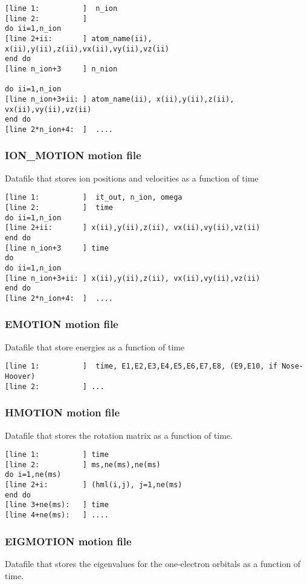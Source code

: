 \begin{verbatim}
[line 1:          ]  n_ion
[line 2:          ]  
do ii=1,n_ion
[line 2+ii:       ] atom_name(ii), x(ii),y(ii),z(ii),vx(ii),vy(ii),vz(ii)
end do
[line n_ion+3     ] n_nion

do ii=1,n_ion
[line n_ion+3+ii: ] atom_name(ii), x(ii),y(ii),z(ii), vx(ii),vy(ii),vz(ii)
end do
[line 2*n_ion+4:  ]  ....
\end{verbatim}


\subsubsection{ION\_MOTION motion file}
Datafile that stores ion positions and velocities
as a function of time

\begin{verbatim}
[line 1:          ]  it_out, n_ion, omega
[line 2:          ]  time
do ii=1,n_ion
[line 2+ii:       ] x(ii),y(ii),z(ii), vx(ii),vy(ii),vz(ii)
end do
[line n_ion+3     ] time
do 
do ii=1,n_ion
[line n_ion+3+ii: ] x(ii),y(ii),z(ii), vx(ii),vy(ii),vz(ii)
end do
[line 2*n_ion+4:  ]  ....
\end{verbatim}

\subsubsection{EMOTION motion file}
Datafile that store energies as a function of time
\begin{verbatim}
[line 1:          ]  time, E1,E2,E3,E4,E5,E6,E7,E8, (E9,E10, if Nose-Hoover)
[line 2:          ] ...
\end{verbatim}


\subsubsection{HMOTION motion file}
Datafile that stores the rotation matrix
as a function of time.

\begin{verbatim}
[line 1:          ] time
[line 2:          ] ms,ne(ms),ne(ms)
do i=1,ne(ms)
[line 2+i:        ] (hml(i,j), j=1,ne(ms)
end do
[line 3+ne(ms):   ] time
[line 4+ne(ms):   ] ....
\end{verbatim}


\subsubsection{EIGMOTION motion file}
Datafile that stores the eigenvalues for the one-electron
orbitals as a function of time.

